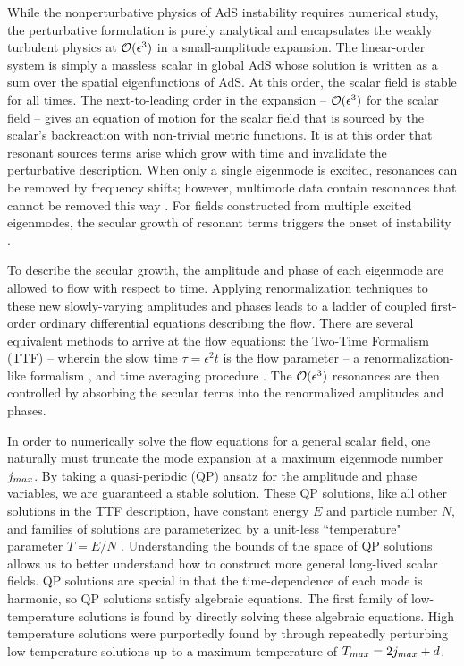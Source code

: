 \documentclass[../PhD.tex]{subfiles}
\begin{document}
While the nonperturbative physics of AdS instability requires numerical study, the perturbative formulation is purely analytical and encapsulates the weakly turbulent physics at $\mathcal O(\epsilon^3)$ in a small-amplitude expansion. The linear-order system is simply a massless scalar in global AdS whose solution is written as a sum over the spatial eigenfunctions of AdS. At this order, the scalar field is stable for all times. The next-to-leading order in the expansion -- $\mathcal O(\epsilon^3)$ for the scalar field -- gives an equation of motion for the scalar field that is sourced by the scalar's backreaction with non-trivial metric functions. It is at this order that resonant sources terms arise which grow with time and invalidate the perturbative description. When only a single eigenmode is excited, resonances can be removed by frequency shifts; however, multimode data contain resonances that cannot be removed this way \cite{1109.1825}. For fields constructed from multiple excited eigenmodes, the secular growth of resonant terms triggers the onset of instability \cite{1109.1825, 1306.0317, 1312.5544, 1506.03519}.

To describe the secular growth, the amplitude and phase of each eigenmode are allowed to flow with respect to time. Applying renormalization techniques to these new slowly-varying amplitudes and phases leads to a ladder of coupled first-order ordinary differential equations describing the flow.  There are several equivalent methods to arrive at the flow equations: the Two-Time Formalism (TTF) -- wherein the slow time $\tau = \epsilon^2 t$ is the flow parameter \cite{1403.6471} -- a renormalization-like formalism \cite{1407.6273,1412.3249}, and time averaging procedure \cite{1412.3249,1510.07836}. The $\mathcal O(\epsilon^3)$ resonances are then controlled by absorbing the secular terms into the renormalized amplitudes and phases.

In order to numerically solve the flow equations for a general scalar field, one naturally must truncate the mode expansion at a maximum eigenmode number $j_{max}$. By taking a quasi-periodic (QP) ansatz for the amplitude and phase variables, we are guaranteed a stable solution. These QP solutions, like all other solutions in the TTF description, have constant energy $E$ and particle number $N$, and families of solutions are parameterized by a unit-less ``temperature" parameter $T= E/N$ \cite{1403.6471,1507.08261}. Understanding the bounds of the space of QP solutions allows us to better understand how to construct more general long-lived scalar fields. QP solutions are special in that the time-dependence of each mode is harmonic, so QP solutions satisfy algebraic equations. The first family of low-temperature solutions is found by directly solving these algebraic equations. High temperature solutions were purportedly found by \cite{1507.08261} through repeatedly perturbing low-temperature solutions up to a maximum temperature of $T_{max} = 2j_{max} + d$. 
\end{document}
